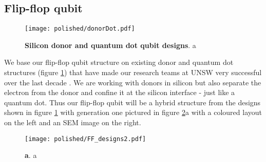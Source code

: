 \subsection{Flip-flop qubit} \label{sec:designFF}

\begin{figure}
	\centering
	\texttt{[image: polished/donorDot.pdf]}
	\caption[Silicon donor and quantum dot qubit designs]{\textbf{Silicon donor and quantum dot qubit designs}. a }
	\label{fig:donorDotDevices}
\end{figure}

We base our flip-flop qubit structure on existing donor and quantum dot structures (figure \ref{fig:donorDotDevices}) that have made our research teams at UNSW very successful over the last decade \cite{Muhonen2014, Veldhorst2014}. We are working with donors in silicon but also separate the electron from the donor and confine it at the silicon interface - just like a quantum dot. Thus our flip-flop qubit will be a hybrid structure from the designs shown in figure \ref{fig:donorDotDevices} with generation one pictured in figure \ref{fig:designFF}a with a coloured layout on the left and an SEM image on the right. 

\begin{figure}
	\centering
	\texttt{[image: polished/FF\_designs2.pdf]}
	\caption[Flip flop design]{\textbf{a}. a }
	\label{fig:designFF}
\end{figure}

